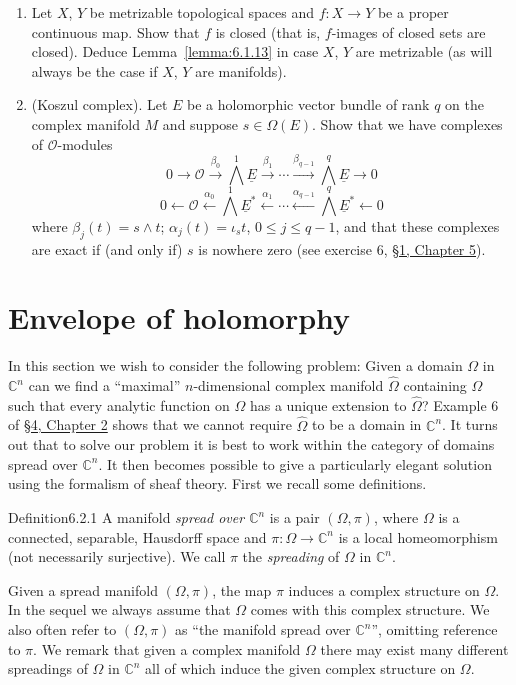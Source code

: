 \begin{enumerate}
\item Let $X$, $Y$ be metrizable topological spaces and $f:X\to Y$ be a proper continuous map. Show that $f$ is closed (that is, $f$-images of closed sets are closed). Deduce Lemma~\ref{lemma:6.1.13} in case $X$, $Y$ are metrizable (as will always be the case if $X$, $Y$ are manifolds).
\item (Koszul complex). Let $E$ be a holomorphic vector bundle of rank $q$ on the complex manifold $M$ and suppose $s\in\Omega(E)$. Show that we have complexes of $\mathcal O$-modules
\[
0\to\mathcal O\xrightarrow{\beta_0}\bigwedge^1\underline E\xrightarrow{\beta_1}\cdots\xrightarrow{\beta_{q-1}}\bigwedge^q\underline E\to0
\]
\[
0\leftarrow\mathcal O\xleftarrow{\alpha_0}\bigwedge^1\underline E^*\xleftarrow{\alpha_1}\cdots\xleftarrow{\alpha_{q-1}}\bigwedge^q\underline E^*\leftarrow0
\]
where $\beta_j(t)=s\wedge t$; $\alpha_j(t)=\iota_s t$, $0\leq j\leq q-1$, and that these complexes are exact if (and only if) $s$ is nowhere zero (see exercise 6, \hyperref[sec:5:1]{\S1, Chapter 5}).
\end{enumerate}

\section{Envelope of holomorphy}\label{sec:6:2}
In this section we wish to consider the following problem: Given a domain $\Omega$ in $\mathbb C^n$ can we find a ``maximal'' $n$-dimensional complex manifold $\widehat\Omega$ containing $\Omega$ such that every analytic function on $\Omega$ has a unique extension to $\widehat\Omega$? Example 6 of \hyperref[sec:2:4]{\S4, Chapter 2} shows that we cannot require $\widehat\Omega$ to be a domain in $\mathbb C^n$. It turns out that to solve our problem it is best to work within the category of domains spread over $\mathbb C^n$. It then becomes possible to give a particularly elegant solution using the formalism of sheaf theory. First we recall some definitions.
\begin{originaltheorem}{Definition}{6.2.1}
A manifold \emph{spread over $\mathbb C^n$} is a pair $(\Omega,\pi)$, where $\Omega$ is a connected, separable, Hausdorff space and $\pi:\Omega\to\mathbb C^n$ is a local homeomorphism (not necessarily surjective). We call $\pi$ the \emph{spreading} of $\Omega$ in $\mathbb C^n$.
\end{originaltheorem}
Given a spread manifold $(\Omega,\pi)$, the map $\pi$ induces a complex structure on $\Omega$. In the sequel we always assume that $\Omega$ comes with this complex structure. We also often refer to $(\Omega,\pi)$ as ``the manifold spread over $\mathbb C^n$'', omitting reference to $\pi$. We remark that given a complex manifold $\Omega$ there may exist many different spreadings of $\Omega$ in $\mathbb C^n$ all of which induce the given complex structure on $\Omega$.

